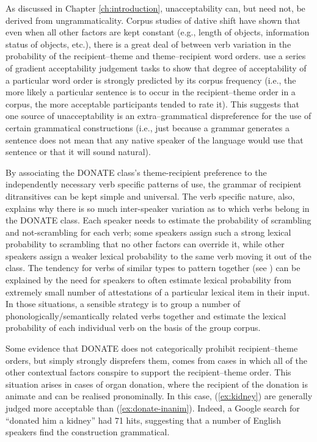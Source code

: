As discussed in Chapter \ref{ch:introduction}, unacceptability can, but need not, be derived from ungrammaticality. Corpus studies of dative shift \citep{Collins.1995,Bresnan.2007,Bresnan.2009} have shown that even when all other factors are kept constant (e.g., length of objects, information status of objects, etc.), there is a great deal of between verb variation in the probability of the recipient--theme and theme--recipient word orders. \cite{Bresnan.2010} use a series of gradient acceptability judgement tasks to show that degree of acceptability of a particular word order is strongly predicted by its corpus frequency (i.e., the more likely a particular sentence is to occur in the recipient--theme order in a corpus, the more acceptable participants tended to rate it). This suggests that one source of unacceptability is an extra--grammatical dispreference for the use of certain grammatical constructions (i.e., just because a grammar generates a sentence does not mean that any native speaker of the language would use that sentence or that it will sound natural). 

By associating the DONATE class's theme-recipient preference to the independently necessary verb specific patterns of use, the grammar of recipient ditransitives can be kept simple and universal. The verb specific nature, also, explains why there is so much inter-speaker variation as to which verbs belong in the DONATE class. Each speaker needs to estimate the probability of scrambling and not-scrambling for each verb; some speakers assign such a strong lexical probability to scrambling that no other factors can override it, while other speakers assign a weaker lexical probability to the same verb moving it out of the class. The tendency for verbs of similar types to pattern together (see \citealt{Levin.1993}) can be explained by the need for speakers to often estimate lexical probability from extremely small number of attestations of a particular lexical item in their input. In those situations, a sensible strategy is to group a number of phonologically/semantically related verbs together and estimate the lexical probability of each individual verb on the basis of the group corpus.

Some evidence that DONATE does not categorically prohibit recipient--theme orders, but simply strongly disprefers them, comes from cases in which all of the other contextual factors conspire to support the recipient--theme order. This situation arises in cases of organ donation, where the recipient of the donation is animate and can be realised pronominally. In this case, (\ref{ex:kidney}) are generally judged more acceptable than (\ref{ex:donate-inanim}). Indeed, a Google search for ``donated him a kidney'' had 71 hits, suggesting that a number of English speakers find the construction grammatical.

